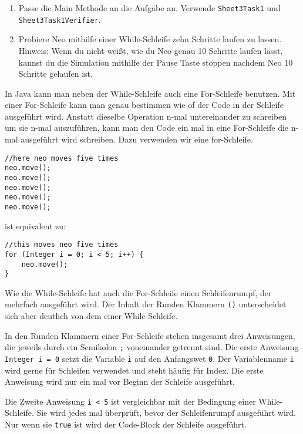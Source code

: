 
\begin{enumerate}
	\item Passe die Main Methode an die Aufgabe an. 
		Verwende \lstinline{Sheet3Task1} und \lstinline{Sheet3Task1Verifier}.
	\item Probiere Neo mithilfe einer While-Schleife zehn Schritte laufen zu lassen.\\
	
		Hinweis: Wenn du nicht weißt, wie du Neo genau 10 Schritte laufen lässt, kannst du die Simulation mithilfe der Pause Taste stoppen nachdem Neo 10 Schritte gelaufen ist.
\end{enumerate}


\begin{Infobox}
	In Java kann man neben der While-Schleife auch eine For-Schleife benutzen.
	Mit einer For-Schleife kann man genau bestimmen wie of der Code in der Schleife ausgeführt wird.
	Anstatt dieselbe Operation n-mal untereinander zu schreiben um sie n-mal auszuführen, kann man den Code ein mal in eine For-Schleife die n-mal ausgeführt wird schreiben.
	Dazu verwenden wir eine for-Schleife. 

	\begin{lstlisting}[numbers=none]
//here neo moves five times
neo.move();
neo.move();
neo.move();
neo.move();
neo.move();
	\end{lstlisting}
	
	ist equivalent zu:

	\begin{lstlisting}[numbers=none]
//this moves neo five times
for (Integer i = 0; i < 5; i++) {
	neo.move();
}
	\end{lstlisting}

	Wie die While-Schleife hat auch die For-Schleife einen Schleifenrumpf, der mehrfach ausgeführt wird.
	Der Inhalt der Runden Klammern \lstinline{()} unterscheidet sich aber deutlich von dem einer While-Schleife.

	In den Runden Klammern einer For-Schleife stehen insgesamt drei Anweisungen, die jeweils durch ein Semikolon \lstinline{;} voneinander getrennt sind.
	Die erste Anweisung \lstinline{Integer i = 0} setzt die Variable \lstinline{i} auf den Anfangswet \lstinline{0}.
	Der Variablenname \lstinline{i} wird gerne für Schleifen verwendet und steht häufig für Index.
	Die erste Anweisung wird nur ein mal vor Beginn der Schleife ausgeführt.
	
	Die Zweite Anweisung \lstinline{i < 5} ist vergleichbar mit der Bedingung einer While-Schleife.
	Sie wird jedes mal überprüft, bevor der Schleifenrumpf ausgeführt wird.
	Nur wenn sie \lstinline{true} ist wird der Code-Block der Schleife ausgeführt.


\end{Infobox}
